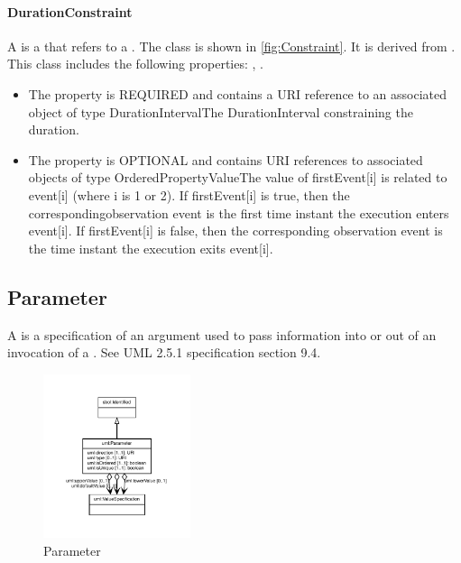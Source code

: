 \paragraph{DurationConstraint}%
\label{sec:uml:DurationConstraint}%
A  is a  that refers to a .%
\newline%
\linebreak%
The  class is shown in \ref{fig:Constraint}. It is derived from .%
This class includes the following properties: , . %
\begin{itemize}%
\item%
The  property is REQUIRED and contains a URI reference to an associated object of type DurationIntervalThe DurationInterval constraining the duration.%
\item%
The  property is OPTIONAL and contains URI references to associated objects of type OrderedPropertyValueThe value of firstEvent[i] is related to event[i] (where i is 1 or 2). If firstEvent[i] is true, then the correspondingobservation event is the first time instant the execution enters event[i]. If firstEvent[i] is false, then the corresponding observation event is the time instant the execution exits event[i].%
\end{itemize}%
\subsection{Parameter}%
\label{sec:uml:Parameter}%
A  is a specification of an argument used to pass information into or out of an invocation of a . See UML 2.5.1 specification section 9.4.%
\newline%
\linebreak%


\begin{figure}[h!]%
\centering%
\includegraphics[width=0.3842553191489362\textwidth]{uml_classes/Parameter_abstraction_hierarchy.pdf}%
\caption{Parameter}%
\label{fig:Parameter}%
\end{figure}

